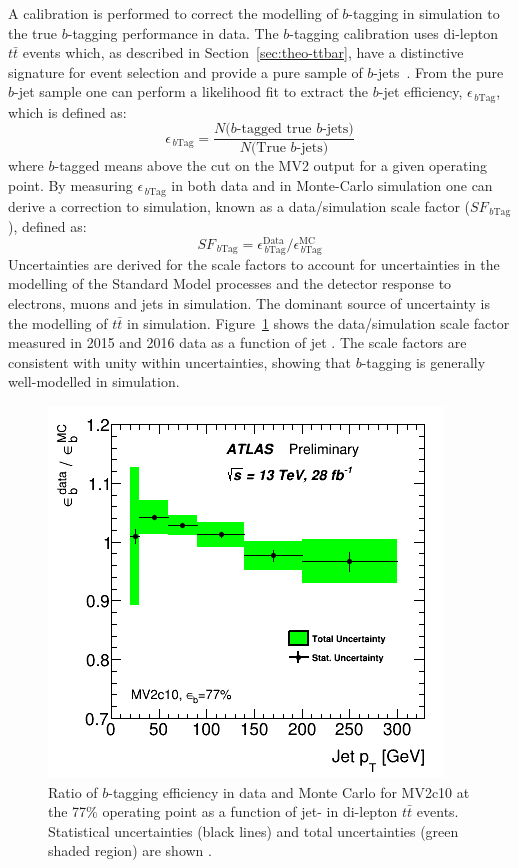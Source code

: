 A calibration is performed to correct the modelling of $b$-tagging in simulation to the true $b$-tagging performance in data.
The $b$-tagging calibration uses di-lepton $t\bar{t}$ events which, as described in Section~\ref{sec:theo-ttbar},
have a distinctive signature for event selection and provide a pure sample of $b$-jets~\cite{obj-bjets_calib_tech,obj-bjets_calib_plots}.
From the pure $b$-jet sample one can perform a likelihood fit to extract the $b$-jet efficiency, $\epsilon_{\,b\text{Tag}}$, which is defined as:
\begin{equation}
 \epsilon_{\,b\text{Tag}} = \frac{N(\text{$b$-tagged true $b$-jets)}}{N(\text{True $b$-jets)}}
\end{equation}
where $b$-tagged means above the cut on the MV2 output for a given operating point.
By measuring $\epsilon_{\,b\text{Tag}}$ in both data and in Monte-Carlo simulation one can derive
a correction to simulation, known as a data/simulation scale factor ($SF_{\,b\text{Tag}}$), defined as:
\begin{equation}
 SF_{\,b\text{Tag}} = \epsilon_{\,b\text{Tag}}^{\text{Data}}/\epsilon_{\,b\text{Tag}}^{\text{MC}}
\end{equation}
Uncertainties are derived for the scale factors 
to account for uncertainties in the modelling of the Standard Model processes and the detector response to electrons, muons and jets in simulation.
The dominant source of uncertainty is the modelling of $t\bar{t}$ in simulation.
Figure~\ref{fig:obj-bjets_calib} shows the data/simulation scale factor measured in 2015 and 2016 data as a function of jet \pT{}.
The scale factors are consistent with unity within uncertainties, showing that $b$-tagging is generally well-modelled in simulation.

\begin{figure}[!ht]
  \begin{center}
    \includegraphics[width=0.55\linewidth, angle=0]{figs/Objects/bjets_calib_pt.png} 
  \end{center}
  \vspace{-1em}
  \caption[Ratio of $b$-tagging efficiency in data and Monte Carlo for MV2c10 at the 77\% operating point as a function of jet-\pT{} in di-lepton $t\bar{t}$ events.]
          {\label{fig:obj-bjets_calib} Ratio of $b$-tagging efficiency in data and Monte Carlo for MV2c10 at the 77\% operating point as a function of jet-\pT{}
  in di-lepton $t\bar{t}$ events. Statistical uncertainties (black lines) and total uncertainties (green shaded region) are shown \cite{obj-bjets_calib_plots}.}
\end{figure}

